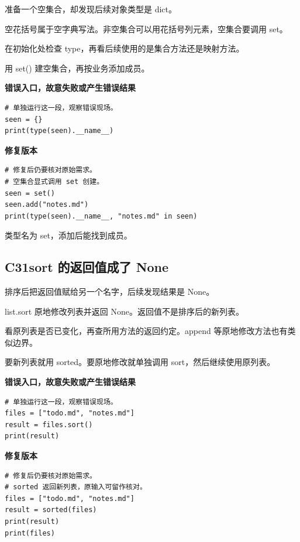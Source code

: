 \documentclass[UTF8,a4paper,oneside,openany,fontset=none,11pt]{ctexbook}
\newcommand{\code}[1]{\texttt{\detokenize{#1}}}
\newcommand{\CaseStep}[2]{\par\smallskip{\bfseries\color{Muted}#1}\enspace #2\par}
\begin{document}
\CaseStep{现象}{准备一个空集合，却发现后续对象类型是 dict。}

\CaseStep{原因}{空花括号属于空字典写法。非空集合可以用花括号列元素，空集合要调用 set。}

\CaseStep{排查}{在初始化处检查 type，再看后续使用的是集合方法还是映射方法。}

\CaseStep{修复}{用 set() 建空集合，再按业务添加成员。}

\textbf{错误入口，故意失败或产生错误结果}

\begin{lstlisting}[style=errorcode,title={错误复现（故意失败或错误结果）：\code{case_30_bad.py.txt}}]
# 单独运行这一段，观察错误现场。
seen = {}
print(type(seen).__name__)
\end{lstlisting}

\textbf{修复版本}

\begin{lstlisting}[title={\code{case_30.py}}]
# 修复后仍要核对原始需求。
# 空集合显式调用 set 创建。
seen = set()
seen.add("notes.md")
print(type(seen).__name__, "notes.md" in seen)
\end{lstlisting}

\CaseStep{复验}{类型名为 set，添加后能找到成员。}

\subsection*{C31\enspace sort 的返回值成了 None}

\CaseStep{现象}{排序后把返回值赋给另一个名字，后续发现结果是 None。}

\CaseStep{原因}{list.sort 原地修改列表并返回 None。返回值不是排序后的新列表。}

\CaseStep{排查}{看原列表是否已变化，再查所用方法的返回约定。append 等原地修改方法也有类似边界。}

\CaseStep{修复}{要新列表就用 sorted。要原地修改就单独调用 sort，然后继续使用原列表。}

\textbf{错误入口，故意失败或产生错误结果}

\begin{lstlisting}[style=errorcode,title={错误复现（故意失败或错误结果）：\code{case_31_bad.py.txt}}]
# 单独运行这一段，观察错误现场。
files = ["todo.md", "notes.md"]
result = files.sort()
print(result)
\end{lstlisting}

\textbf{修复版本}

\begin{lstlisting}[title={\code{case_31.py}}]
# 修复后仍要核对原始需求。
# sorted 返回新列表，原输入可留作核对。
files = ["todo.md", "notes.md"]
result = sorted(files)
print(result)
print(files)
\end{lstlisting}
\end{document}
